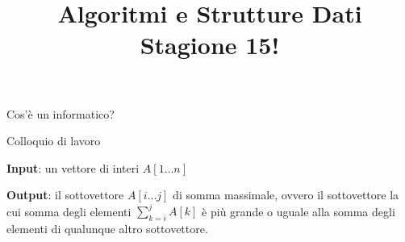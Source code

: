 

\usepackage{epigraph}
\usepackage{listings}
\usepackage{colortbl}


\newcommand{\Sum}{\mathit{sum}}
\newcommand{\MaxSoFar}{\mathit{maxSoFar}}
\newcommand{\MaxEndingHere}{\mathit{maxEndingHere}}

\newcommand*{\RC}[1]{\hfill\makebox[3.0cm][l]{#1}}%


\title[ASD - Introduzione]{\textbf{Algoritmi e Strutture Dati}\\[24pt]
Stagione 15!}

\graphicspath{{figs/00/}}



\FrameTitle{}

\begin{frame}{Cos'è un informatico?}
\end{frame}

\begin{frame}{Colloquio di lavoro}
	
\vspace{-9pt}
\begin{myboxtitle}
\BI
\item \textbf{Input}: un vettore di interi $A[1 \ldots n]$
\item \textbf{Output}: il sottovettore $A[i \ldots j]$ di somma massimale,
ovvero il sottovettore la cui somma degli elementi $\sum_{k=i}^j A[k]$ è
più grande o uguale alla somma degli elementi di qualunque altro sottovettore.
\EI
\end{myboxtitle}
\end{frame}

